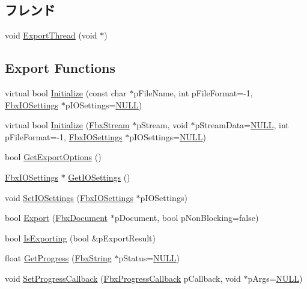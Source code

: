 \subsection*{フレンド}
\begin{DoxyCompactItemize}
\item 
void \hyperlink{class_fbx_exporter_af010f0ee37fe98ae37cd7cbe976e7a74}{Export\+Thread} (void $\ast$)
\end{DoxyCompactItemize}
\subsection*{Export Functions}
\begin{DoxyCompactItemize}
\item 
virtual bool \hyperlink{class_fbx_exporter_acab60199145f0c86b80fac8ed7e1b239}{Initialize} (const char $\ast$p\+File\+Name, int p\+File\+Format=-\/1, \hyperlink{class_fbx_i_o_settings}{Fbx\+I\+O\+Settings} $\ast$p\+I\+O\+Settings=\hyperlink{fbxarch_8h_a070d2ce7b6bb7e5c05602aa8c308d0c4}{N\+U\+LL})
\item 
virtual bool \hyperlink{class_fbx_exporter_ae87b3014d3aa797617c530361296daa5}{Initialize} (\hyperlink{class_fbx_stream}{Fbx\+Stream} $\ast$p\+Stream, void $\ast$p\+Stream\+Data=\hyperlink{fbxarch_8h_a070d2ce7b6bb7e5c05602aa8c308d0c4}{N\+U\+LL}, int p\+File\+Format=-\/1, \hyperlink{class_fbx_i_o_settings}{Fbx\+I\+O\+Settings} $\ast$p\+I\+O\+Settings=\hyperlink{fbxarch_8h_a070d2ce7b6bb7e5c05602aa8c308d0c4}{N\+U\+LL})
\item 
bool \hyperlink{class_fbx_exporter_a1d698ddca2a7720a3c05b00afea5b413}{Get\+Export\+Options} ()
\item 
\hyperlink{class_fbx_i_o_settings}{Fbx\+I\+O\+Settings} $\ast$ \hyperlink{class_fbx_exporter_a80853ac3257f1cfb95478f969bdc002a}{Get\+I\+O\+Settings} ()
\item 
void \hyperlink{class_fbx_exporter_a072f9f312b878c796463bf9f9a2e43e0}{Set\+I\+O\+Settings} (\hyperlink{class_fbx_i_o_settings}{Fbx\+I\+O\+Settings} $\ast$p\+I\+O\+Settings)
\item 
bool \hyperlink{class_fbx_exporter_a8a92372cf76fe3486a798c87973cc791}{Export} (\hyperlink{class_fbx_document}{Fbx\+Document} $\ast$p\+Document, bool p\+Non\+Blocking=false)
\item 
bool \hyperlink{class_fbx_exporter_a244daae57da4509caa361160f0ae3e23}{Is\+Exporting} (bool \&p\+Export\+Result)
\item 
float \hyperlink{class_fbx_exporter_a9063d4a8ee7c7dbe1c5deaeef6bfbd2d}{Get\+Progress} (\hyperlink{class_fbx_string}{Fbx\+String} $\ast$p\+Status=\hyperlink{fbxarch_8h_a070d2ce7b6bb7e5c05602aa8c308d0c4}{N\+U\+LL})
\item 
void \hyperlink{class_fbx_exporter_a37b5449c65be8b77eae754fb52da3c1c}{Set\+Progress\+Callback} (\hyperlink{fbxprogress_8h_a3765040904b462fb1f2673caba3488db}{Fbx\+Progress\+Callback} p\+Callback, void $\ast$p\+Args=\hyperlink{fbxarch_8h_a070d2ce7b6bb7e5c05602aa8c308d0c4}{N\+U\+LL})
\end{DoxyCompactItemize}
